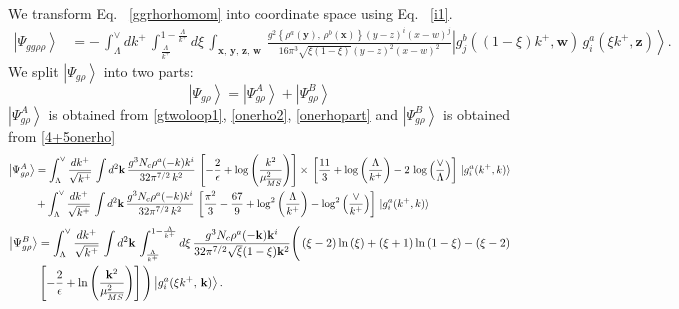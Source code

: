 \documentclass[10pt]{article}
\numberwithin{equation}{section}
\begin{document}
We transform Eq.~ \eqref{ggrhorhomom} into coordinate space using Eq.~ \eqref{i1}. 
\begin{align} \label{ggrhorhopos}
    \left|\Psi_{gg\rho\rho}\right\rangle & =  -\,\int_{\Lambda}^{\vee}dk^{+}\,\int_{\frac{\Lambda}{k^{+}}}^{1-\frac{\Lambda}{k^{+}}}d\xi\,\int_{\mathbf{x},\,\mathbf{y},\,\mathbf{z},\,\mathbf{w}}\,\frac{g^{2}\left\{ \rho^{a}(\mathbf{y}),\,\rho^{b}(\mathbf{x})\right\} (y-z)^{i}(x-w)^{j}}{16\pi^{3}\sqrt{\xi(1-\xi)}(y-z)^{2}(x-w)^{2}}\left|g_{j}^{b}((1-\xi)k^{+},\mathbf{w})\, g_{i}^{a}(\xi k^{+},\mathbf{z})\right\rangle .
\end{align}
We split $\left|\Psi_{g\rho}\right\rangle$ into two parts: 
$$\left|\Psi_{g\rho}\right\rangle = \left|\Psi^{A}_{g\rho}\right\rangle + \left|\Psi^{B}_{g\rho}\right\rangle $$
$\left|\Psi^{A}_{g\rho}\right\rangle$ is obtained from \eqref{gtwoloop1}, \eqref{onerho2}, \eqref{onerhopart} and $\left|\Psi^{B}_{g\rho}\right\rangle$ is obtained from \eqref{4+5onerho} 
\begin{align}
     \left|\Psi^{A}_{g\rho}\right\rangle & =\int_{\Lambda}^{\vee}\frac{dk^{+}}{\sqrt{k^{+}}}\,\int d^{2}\mathbf{k}\,\frac{g^{3}N_{c}\rho^{a}(-k)k^{i}}{32\pi^{7/2}\,k^{2}}\,\left[-\frac{2}{\epsilon}+\log{\left(\frac{k^{2}}{\mu^{2}_{\overline{MS}}}\right)}\right]\times\, \left[\frac{11}{3}+\log{\left(\frac{\Lambda}{k^{+}}\right)}-2\,\log{\left(\frac{\vee}{\Lambda}\right)}\right]\, \ket{g^{a}_{i}(k^{+},k)}\notag \\ & + \int_{\Lambda}^{\vee}\frac{dk^{+}}{\sqrt{k^{+}}}\,\int d^{2}\mathbf{k}\,\frac{g^{3}N_{c}\rho^{a}(-k)k^{i}}{32\pi^{7/2}\,k^{2}}\, \left[\frac{\pi^{2}}{3} - \frac{67}{9} +\log^{2}\left(\frac{\Lambda}{k^{+}}\right)-\log^{2}\left(\frac{\vee}{k^{+}}\right)\right]\, \ket{g^{a}_{i}(k^{+},k)}
\end{align}
\begin{align}
 \left|\Psi^{B}_{g\rho}\right\rangle & = \int_{\Lambda}^{\vee}\frac{dk^{+}}{\sqrt{k^{+}}}\,\int d^{2}\mathbf{k}\,\int_{\frac{\Lambda}{k^{+}}}^{1-\frac{\Lambda}{k^{+}}}d\xi\,\frac{g^{3}N_{c}\rho^{a}(-\mathbf{k})\mathbf{k}^{i}}{32\pi^{7/2}\sqrt{\xi}(1-\xi)\mathbf{k}^{2}}\Bigg(\left(\xi-2\right)\ln\left(\xi\right)+\left(\xi+1\right)\ln\left(1-\xi\right)-\left(\xi-2\right)\notag \\ & \left[-\frac{2}{\epsilon}+\ln\left(\frac{\mathbf{k}^{2}}{\mu_{\overline{MS}}^{2}}\right)\right]\Bigg)\left|g_{i}^{a}(\xi k^{+},\, \mathbf{k})\right\rangle.
\end{align}
\end{document}
